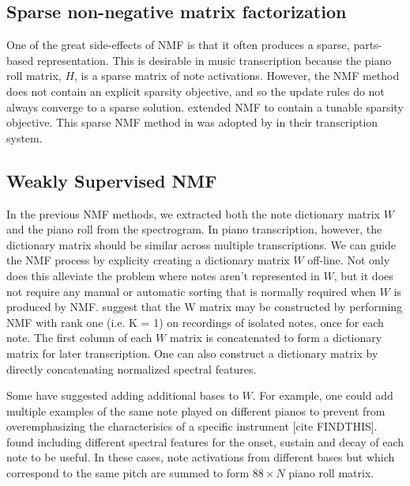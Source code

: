 \documentclass[5p]{elsarticle}
\begin{document}
\subsection{Sparse non-negative matrix factorization}

One of the great side-effects of NMF is that it often produces a sparse, parts-based representation. This is desirable in music transcription because the piano roll matrix, $H$, is a sparse matrix of note activations. However, the NMF method does not contain an explicit sparsity objective, and so the update rules do not always converge to a sparse solution. \citet{hoyer2004non} extended NMF to contain a tunable sparsity objective. This sparse NMF method in \citet{hoyer2004non} was adopted by \citet{abdallah2004polyphonic} in their transcription system.



\subsection{Weakly Supervised NMF}

In the previous NMF methods, we extracted both the note dictionary matrix $W$ and the piano roll from the spectrogram. In piano transcription, however, the dictionary matrix should be similar across multiple transcriptions. We can guide the NMF process by explicity creating a dictionary matrix $W$ off-line. Not only does this alleviate the problem where notes aren't represented in $W$, but it does not require any manual or automatic sorting that is normally required when $W$ is produced by NMF. \citet{weninger2013discriminative} suggest that the W matrix may be constructed by performing NMF with rank one (i.e. K = 1) on recordings of isolated notes, once for each note. The first column of each $W$ matrix is concatenated to form a dictionary matrix for later transcription. One can also construct a dictionary matrix by directly concatenating normalized spectral features\cite{niedermayer2008non}.

Some have suggested adding additional bases to $W$. For example, one could add multiple examples of the same note played on different pianos to prevent from overemphasizing the characterisics of a specific instrument [cite FINDTHIS]. \citet{weninger2013discriminative} found including different spectral features for the onset, sustain and decay of each note to be useful. In these cases, note activations from different bases but which correspond to the same pitch are summed to form $88 \times N$ piano roll matrix.
\end{document}
